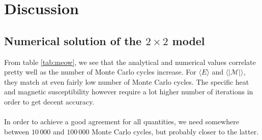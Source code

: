 \documentclass{article}
\begin{document}
\section{Discussion}
\subsection{Numerical solution of the $2\times2$ model}
From table \ref{tab:meow}, we see that the analytical and numerical values correlate pretty well as the number of Monte Carlo cycles increase. For $\langle E\rangle$ and $\langle|\mathcal{M}|\rangle$, they match at even fairly low number of Monte Carlo cycles. The specific heat and magnetic susceptibility however require a lot higher number of iterations in order to get decent accuracy.\\\\
In order to achieve a good agreement for all quantities, we need somewhere between $10\,000$ and $100\,000$ Monte Carlo cycles, but probably closer to the latter.
\end{document}
